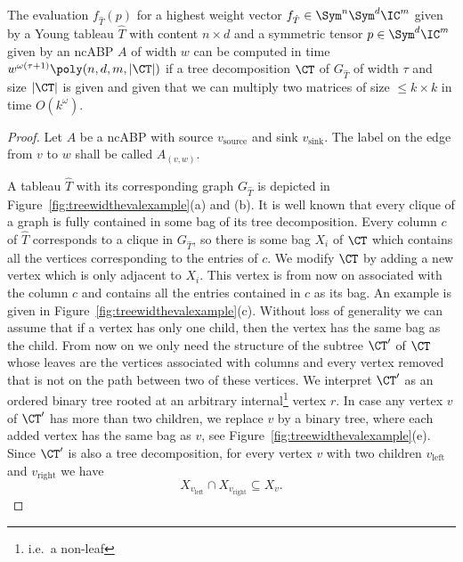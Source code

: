 \begin{theorem}
    \label{thm:evaltreewidth}
    The evaluation $f_{\hat T}(p)$ for a highest weight vector $f_{\hat T} \in \Sym^n\Sym^d \IC^m$ given by a Young tableau $\hat{T}$ with content $n \times d$ and  a symmetric tensor $p \in \Sym^d \IC^m$ given by an ncABP $A$ of width $w$ can be computed in time $w^{\omega(\tau+1)}\poly(n,d,m,|\CT|)$ if a tree decomposition $\CT$ of $G_{\hat{T}}$ of width $\tau$ and size $|\CT|$ is given and given that we can multiply two matrices of size $\leq k \times k$ in time $O(k^\omega)$.
\end{theorem}
\begin{proof}
Let $A$ be a ncABP with source $v_\text{source}$ and sink $v_\text{sink}$. The label on the edge from $v$ to $w$ shall be called $A_{(v,w)}$.

A tableau $\hat T$ with its corresponding graph $G_{\hat T}$ is depicted in Figure~\ref{fig:treewidthevalexample}(a) and (b).
It is well known that every clique of a graph is fully contained in some bag of its tree decomposition.
Every column $c$ of $\hat{T}$ corresponds to a clique in $G_{\hat{T}}$, so there is some bag $X_i$ of $\CT$ which contains all the vertices corresponding to the entries of $c$.
We modify $\CT$ by adding a new vertex which is only adjacent to $X_i$.
This vertex is from now on associated with the column $c$ and contains all the entries contained in $c$ as its bag.
An example is given in Figure~\ref{fig:treewidthevalexample}(c).
Without loss of generality we can assume that if a vertex has only one child, then the vertex has the same bag as the child.
From now on we only need the structure of the subtree $\CT'$ of $\CT$ whose leaves are the vertices associated with columns and every vertex removed that is not on the path between two of these vertices.
We interpret $\CT'$ as an ordered binary tree rooted at an arbitrary internal\footnote{i.e.\ a non-leaf} vertex $r$.
In case any vertex $v$ of $\CT'$ has more than two children, we replace $v$ by a binary tree, where each added vertex has the same bag as $v$, see Figure~\ref{fig:treewidthevalexample}(e).
Since $\CT'$ is also a tree decomposition, for every vertex $v$ with two children $v_\text{left}$ and $v_\text{right}$ we have
\begin{equation}\label{eq:treedecompinclusion}
X_{v_\text{left}} \cap X_{v_\text{right}}\subseteq X_v.
\end{equation}


\end{proof}
